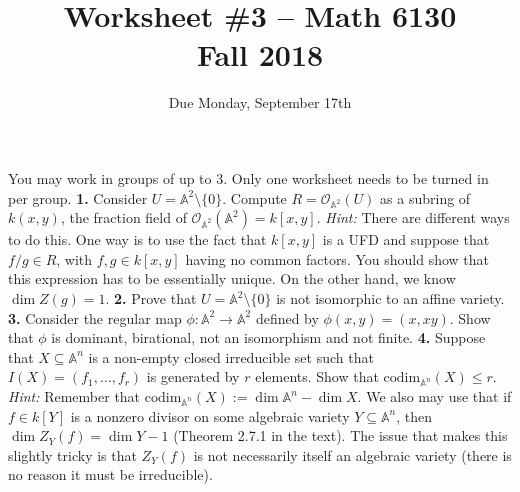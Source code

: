 \documentclass[11pt]{amsart}
\theoremstyle{theorem}
\renewcommand{\O}{\mathcal O}
\renewcommand{\to}[1][]{\xrightarrow{\ #1\ }}
\newcommand{\bA}{\mathbb{A}}
\newcommand{\codim}{{\mathrm{codim}}}
\begin{document}
\title{Worksheet \#3 -- Math 6130\\Fall 2018}
\author{Due Monday, September 17th}

\maketitle
You may work in groups of up to 3.  Only one worksheet needs to be turned in per group.
\vskip 9pt
\noindent
{\bf 1.}  Consider $U = \bA^2 \setminus \{ 0 \}$.  Compute $R = \O_{\bA^2}(U)$ as a subring of $k(x,y)$, the fraction field of $\O_{\bA^2}(\bA^2) = k[x,y]$. 
\vskip 3pt
\emph{Hint:} There are different ways to do this.  One way is to use the fact that $k[x,y]$ is a UFD and suppose that $f/g \in R$, with $f, g \in k[x,y]$ having no common factors.  You should show that this expression has to be essentially unique.  On the other hand, we know $\dim Z(g) = 1$. 
\vskip 200pt
\noindent
{\bf 2.}  Prove that $U = \bA^2 \setminus \{ 0 \}$ is not isomorphic to an affine variety.  
\newpage
\noindent
{\bf 3.}  Consider the regular map $\phi : \bA^2 \to \bA^2$ defined by $\phi(x,y) = (x, xy)$.  Show that $\phi$ is dominant, birational, not an isomorphism and not finite.  
\vskip 250pt
\noindent
{\bf 4.}  Suppose that $X \subseteq \bA^n$ is a non-empty closed irreducible set such that $I(X) = (f_1, \dots, f_r)$ is generated by $r$ elements.  Show that $\codim_{\bA^n}(X) \leq r$.
\vskip 3pt
\emph{Hint:} Remember that $\codim_{\bA^n}(X) := \dim \bA^n - \dim X$.  We also may use that if $f \in k[Y]$ is a nonzero divisor on some algebraic variety $Y \subseteq \bA^n$, then $\dim Z_Y(f) = \dim Y - 1$ (Theorem 2.7.1 in the text).  The issue that makes this slightly tricky is that $Z_Y(f)$ is not necessarily itself an algebraic variety (there is no reason it must be irreducible).
\end{document}
